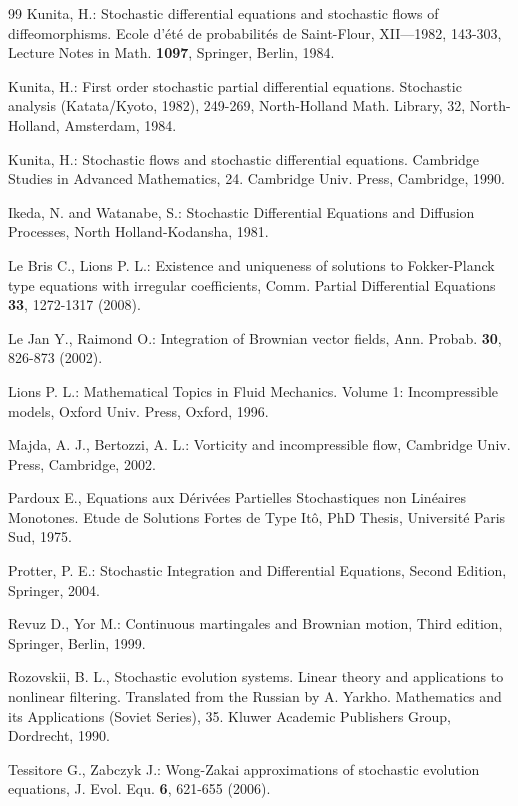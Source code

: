 \documentclass[a4paper,11pt]{article}
\begin{document}
\begin{thebibliography}{99}
  Kunita, H.: Stochastic differential equations and stochastic
flows of diffeomorphisms. Ecole d'\'{e}t\'{e} de probabilit\'{e}s de
Saint-Flour, XII---1982, 143-303, Lecture Notes in Math. \textbf{1097},
Springer, Berlin, 1984.

  Kunita, H.: First order stochastic partial differential
equations. Stochastic analysis (Katata/Kyoto, 1982), 249-269, North-Holland
Math. Library, 32, North-Holland, Amsterdam, 1984.

 Kunita, H.: Stochastic flows and stochastic differential equations.
Cambridge Studies in Advanced Mathematics, 24. Cambridge Univ. Press,
Cambridge, 1990.

  Ikeda, N. and Watanabe, S.: Stochastic Differential Equations
and Diffusion Processes, North Holland-Kodansha, 1981.

  Le Bris C., Lions P. L.: Existence and uniqueness of
solutions to Fokker-Planck type equations with irregular coefficients, Comm.
Partial Differential Equations \textbf{33}, 1272-1317 (2008).

  Le Jan Y., Raimond O.: Integration of Brownian vector fields,
Ann. Probab. \textbf{30}, 826-873 (2002).

  Lions P. L.: Mathematical Topics in Fluid Mechanics. Volume
1: Incompressible models, Oxford Univ. Press, Oxford, 1996.

  Majda, A. J., Bertozzi, A. L.: Vorticity and
incompressible flow, Cambridge Univ. Press, Cambridge, 2002.

  Pardoux E., Equations aux D\'{e}riv\'{e}es Partielles
Stochastiques non Lin\'{e}aires Monotones. Etude de Solutions Fortes de Type
It\^{o}, PhD Thesis, Universit\'{e} Paris Sud, 1975.

  Protter, P. E.: Stochastic Integration and Differential
Equations, Second Edition, Springer, 2004.

  Revuz D., Yor M.: Continuous martingales and Brownian motion,
Third edition, Springer, Berlin, 1999.

  Rozovskii, B. L., Stochastic evolution systems. Linear theory
and applications to nonlinear filtering. Translated from the Russian by A.
Yarkho. Mathematics and its Applications (Soviet Series), 35. Kluwer
Academic Publishers Group, Dordrecht, 1990.

  Tessitore G., Zabczyk J.: Wong-Zakai approximations of
stochastic evolution equations, J. Evol. Equ. \textbf{6}, 621-655 (2006).


\end{thebibliography}
\end{document}
